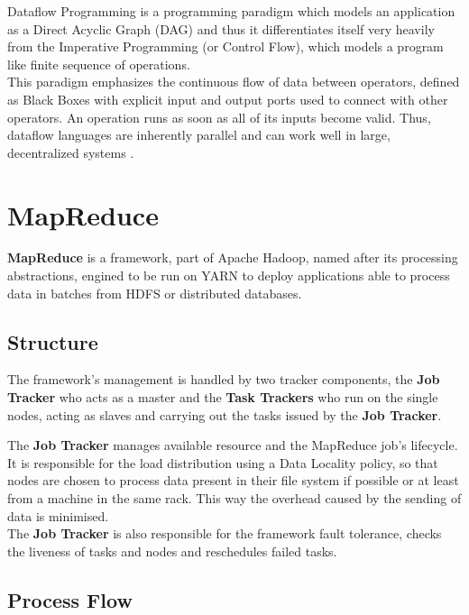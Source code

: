 Dataflow Programming is a programming paradigm which models an application as a Direct Acyclic Graph (DAG) and thus it differentiates itself very heavily from the Imperative Programming (or Control Flow), which models a program like finite sequence of operations.\\
This paradigm emphasizes the continuous flow of data between operators, defined as Black Boxes with explicit input and output ports used to connect with other operators. An operation runs as soon as all of its inputs become valid. Thus, dataflow languages are inherently parallel and can work well in large, decentralized systems \cite{Johnston:2004:ADP:1013208.1013209}.

\pagebreak

\section{MapReduce} \label{MapReduce}

\textbf{MapReduce} \cite{hadoop_doc} is a framework, part of Apache Hadoop, named after its processing  abstractions, engined to be run on YARN to deploy applications able to process data in batches from HDFS or distributed databases. \\

\subsection{Structure}
The framework's management is handled by two tracker components, the \textbf{Job Tracker} who acts as a master and the \textbf{Task Trackers} who run on the single nodes, acting as slaves and carrying out the tasks issued by the \textbf{Job Tracker}.

The \textbf{Job Tracker} manages available resource and the MapReduce job's lifecycle.\\ It is responsible for the load distribution using a Data Locality policy, so that nodes are chosen to process data present in their file system if possible or at least from a machine in the same rack. This way the overhead caused by the sending of data is minimised.
\\
The \textbf{Job Tracker} is also responsible for the framework fault tolerance, checks the liveness of tasks and nodes and reschedules failed tasks.

\subsection{Process Flow}

